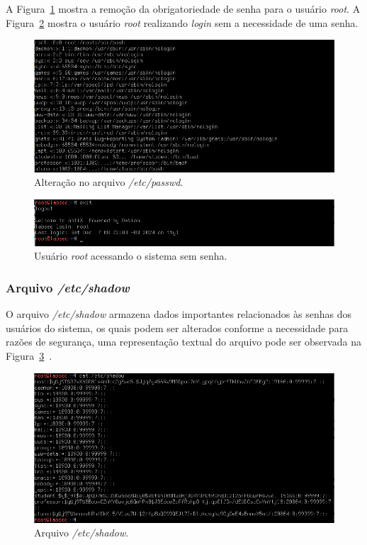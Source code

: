 \documentclass[
    12pt,				%
    oneside,   	        %
    a4paper,			%
    english,			%
    french,				%
    spanish,			%
    brazil,				%
    ]{pacotes/abntex2}
\begin{document}
A Figura~\ref{fig:passwd_root} mostra a remoção da obrigatoriedade de senha para o usuário \textit{root}. A Figura~\ref{fig:login_sem_senha} mostra o usuário \textit{root} realizando \textit{login} sem a necessidade de uma senha. 

\begin{figure}[H]
  \centering
  \includegraphics[scale=0.7]{figuras/passwd_root.png}
  \caption{Alteração no arquivo \textit{/etc/passwd}.}
  \label{fig:passwd_root}
\end{figure}

\begin{figure}[H]
  \centering
  \includegraphics[scale=0.7]{figuras/login_sem_senha.png}
  \caption{Usuário \textit{root} acessando o sistema sem senha.}
  \label{fig:login_sem_senha}
\end{figure}

\subsubsection{Arquivo \textit{/etc/shadow}}
O arquivo \textit{/etc/shadow} armazena dados importantes relacionados às senhas dos usuários do sistema, os quais podem ser alterados conforme a necessidade para razões de segurança, uma representação textual do arquivo pode ser observada na Figura~\ref{fig:shadow}~\cite{guiafocaSegurança}. 

\begin{figure}[H]
  \centering
  \includegraphics[scale=0.7]{figuras/shadow.png}
  \caption{Arquivo \textit{/etc/shadow}.}
  \label{fig:shadow}
\end{figure}
\end{document}
